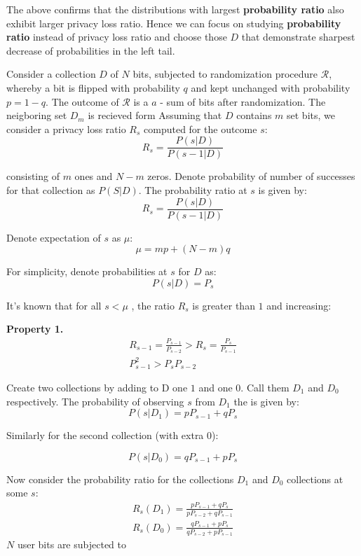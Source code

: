 \documentclass[11pt]{article}
\newcommand{\cR}{\mathcal{R}}
\begin{document}
The above confirms that the distributions with largest \textbf{probability ratio} also exhibit larger privacy loss ratio. Hence we can focus on studying \textbf{probability ratio}  instead of privacy loss ratio and choose those $D$ that demonstrate sharpest decrease of probabilities in the left tail.




Consider a collection $D$ of $N$ bits, subjected to randomization procedure $\cR$, whereby a bit is flipped with probability $q$ and kept unchanged with probability $p=1-q$.  The outcome of $\cR$ is a $a$ - sum of bits after randomization. The neigboring set $D_m$ is recieved form Assuming that $D$ contains $m$ set bits, we consider a privacy loss ratio $R_s$ computed for the outcome $s$:
\[ R_s = \frac{P(s|D)}{P(s-1|D)} \] 


consisting of $m$ ones and $N-m$ zeros.  Denote probability of number of successes for that collection as $P(S|D)$.
The probability ratio at $s$  is given by:
\[ R_s = \frac{P(s|D)}{P(s-1|D)} \] 

Denote expectation of $s$ as $\mu$:
\[ \mu = mp + (N-m)q \]

For simplicity, denote probabilities at $s$ for $D$ as:
\[ P(s|D) = P_{s} \]

It's known that for all $s < \mu$ , the ratio $R_s$ is greater than $1$ and increasing:

\textbf{Property 1.}
\begin{align}
R_{s-1} = \frac{P_{s-1}}{P_{s-2}} > R_s  = \frac{P_{s}}{P_{s-1}} \\
P^2_{s-1} > P_sP_{s-2} 
\end{align}

Create two collections by adding to D one $1$ and one $0$.  Call them $D_1$ and $D_0$ respectively. The probability of observing $s$ from $D_1$ the is given by:
\[ P(s | D_1) = pP_{s-1} + qP_s \]

Similarly for the second collection (with extra 0):

\[ P(s | D_0) = qP_{s-1} + pP_s \]

Now consider the probability ratio for the collections $D_1$ and $D_0$ collections at some $s$:
\begin{align}
R_s(D_1) = \frac{ pP_{s-1} + qP_s }{pP_{s-2} + qP_{s-1}} \\
R_s(D_0) = \frac{ qP_{s-1} + pP_s }{qP_{s-2} + pP_{s-1}}
\end{align}
 $N$ user bits are subjected to  
\end{document}
